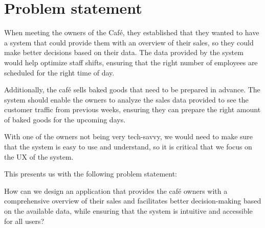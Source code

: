 \section{Problem statement}\label{sec:problem-statement}

When meeting the owners of the Caf\'e, they established that they wanted to have a system that could provide them with
an overview of their sales, so they could make better decisions based on their data.
The data provided by the system would help optimize staff shifts, ensuring that the right number of employees are
scheduled for the right time of day.

Additionally, the caf\'e sells baked goods that need to be prepared in advance.
The system should enable the owners to analyze the sales data provided to see the customer traffic from previous weeks,
ensuring they can prepare the right amount of baked goods for the upcoming days.

With one of the owners not being very tech-savvy, we would need to make sure that the system is easy to use and
understand, so it is critical that we focus on the UX of the system.

This presents us with the following problem statement:
\begin{tcolorbox}[title=Problem statement]
    How can we design an application that provides the caf\'e owners with a comprehensive overview of their sales and
    facilitates better decision-making based on the available data, while ensuring that the system is intuitive and
    accessible for all users?
\end{tcolorbox}
